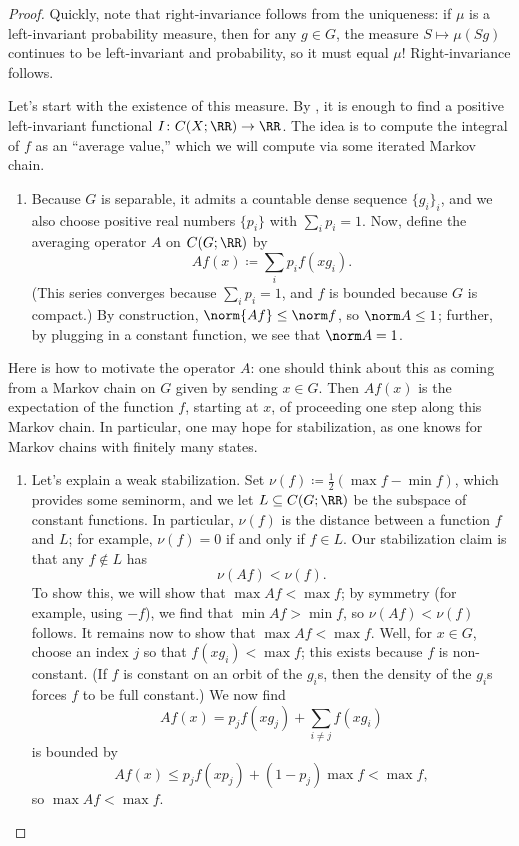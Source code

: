 \documentclass[../notes.tex]{subfiles}
\begin{document}
\begin{proof}
	Quickly, note that right-invariance follows from the uniqueness: if $\mu$ is a left-invariant probability measure, then for any $g\in G$, the measure $S\mapsto\mu(Sg)$ continues to be left-invariant and probability, so it must equal $\mu$! Right-invariance follows.

	Let's start with the existence of this measure. By , it is enough to find a positive left-invariant functional $I\colon C(X;\RR)\to\RR$. The idea is to compute the integral of $f$ as an ``average value,'' which we will compute via some iterated Markov chain.
	\begin{enumerate}
		\item Because $G$ is separable, it admits a countable dense sequence $\{g_i\}_i$, and we also choose positive real numbers $\{p_i\}$ with $\sum_ip_i=1$. Now, define the averaging operator $A$ on $C(G;\RR)$ by
		\[Af(x)\coloneqq\sum_ip_if(xg_i).\]
		(This series converges because $\sum_ip_i=1$, and $f$ is bounded because $G$ is compact.) By construction, $\norm{Af}\le\norm f$, so $\norm A\le1$; further, by plugging in a constant function, we see that $\norm A=1$.
	\end{enumerate}
	\begin{remark}
		Here is how to motivate the operator $A$: one should think about this as coming from a Markov chain on $G$ given by sending $x\in G$. Then $Af(x)$ is the expectation of the function $f$, starting at $x$, of proceeding one step along this Markov chain. In particular, one may hope for stabilization, as one knows for Markov chains with finitely many states.
	\end{remark}
	\begin{enumerate}[resume]
		\item Let's explain a weak stabilization. Set $\nu(f)\coloneqq\frac12(\max f-\min f)$, which provides some seminorm, and we let $L\subseteq C(G;\RR)$ be the subspace of constant functions. In particular, $\nu(f)$ is the distance between a function $f$ and $L$; for example, $\nu(f)=0$ if and only if $f\in L$. Our stabilization claim is that any $f\notin L$ has
		\[\nu(Af)<\nu(f).\]
		To show this, we will show that $\max Af<\max f$; by symmetry (for example, using $-f$), we find that $\min Af>\min f$, so $\nu(Af)<\nu(f)$ follows. It remains now to show that $\max Af<\max f$. Well, for $x\in G$, choose an index $j$ so that $f(xg_i)<\max f$; this exists because $f$ is non-constant. (If $f$ is constant on an orbit of the $g_i$s, then the density of the $g_i$s forces $f$ to be full constant.) We now find
		\[Af(x)=p_jf(xg_j)+\sum_{i\ne j}f(xg_i)\]
		is bounded by
		\[Af(x)\le p_jf(xp_j)+(1-p_j)\max f<\max f,\]
		so $\max Af<\max f$.


\end{enumerate}
\end{proof}
\end{document}
